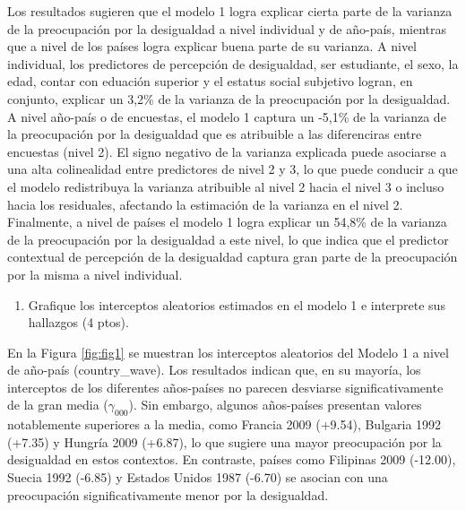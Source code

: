 \documentclass[
  12pt,
  a4paper,
]{article}
\providecommand{\tightlist}{%
  \setlength{\itemsep}{0pt}\setlength{\parskip}{0pt}}
\begin{document}
Los resultados sugieren que el modelo 1 logra explicar cierta parte de la varianza de la preocupación por la desigualdad a nivel individual y de año-país, mientras que a nivel de los países logra explicar buena parte de su varianza. A nivel individual, los predictores de percepción de desigualdad, ser estudiante, el sexo, la edad, contar con eduación superior y el estatus social subjetivo logran, en conjunto, explicar un 3,2\% de la varianza de la preocupación por la desigualdad. A nivel año-país o de encuestas, el modelo 1 captura un -5,1\% de la varianza de la preocupación por la desigualdad que es atribuible a las diferenciras entre encuestas (nivel 2). El signo negativo de la varianza explicada puede asociarse a una alta colinealidad entre predictores de nivel 2 y 3, lo que puede conducir a que el modelo redistribuya la varianza atribuible al nivel 2 hacia el nivel 3 o incluso hacia los residuales, afectando la estimación de la varianza en el nivel 2. Finalmente, a nivel de países el modelo 1 logra explicar un 54,8\% de la varianza de la preocupación por la desigualdad a este nivel, lo que indica que el predictor contextual de percepción de la desigualdad captura gran parte de la preocupación por la misma a nivel individual.

\begin{enumerate}
\def\labelenumi{\alph{enumi})}
\setcounter{enumi}{2}
\tightlist
\item
  Grafique los interceptos aleatorios estimados en el modelo 1 e interprete sus hallazgos (4 ptos).
\end{enumerate}

En la Figura \ref{fig:fig1} se muestran los interceptos aleatorios del Modelo 1 a nivel de año-país (country\_wave). Los resultados indican que, en su mayoría, los interceptos de los diferentes años-países no parecen desviarse significativamente de la gran media (\(\gamma_{000}\)). Sin embargo, algunos años-países presentan valores notablemente superiores a la media, como Francia 2009 (+9.54), Bulgaria 1992 (+7.35) y Hungría 2009 (+6.87), lo que sugiere una mayor preocupación por la desigualdad en estos contextos. En contraste, países como Filipinas 2009 (-12.00), Suecia 1992 (-6.85) y Estados Unidos 1987 (-6.70) se asocian con una preocupación significativamente menor por la desigualdad.
\end{document}
